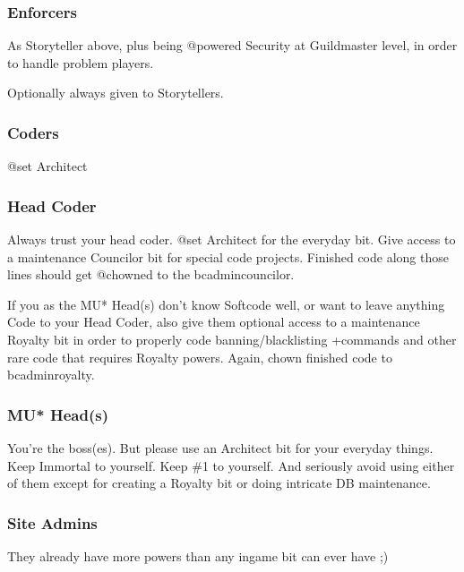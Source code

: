 \documentclass[letterpaper,10pt,english]{sphinxmanual}
\begin{document}
\subsubsection{Enforcers}
\label{\detokenize{gettingstarted:enforcers}}
\sphinxAtStartPar
As Storyteller above, plus being @powered Security at
Guildmaster level, in order to handle problem players.

\sphinxAtStartPar
Optionally always given to Storytellers.


\subsubsection{Coders}
\label{\detokenize{gettingstarted:coders}}
\sphinxAtStartPar
@set Architect


\subsubsection{Head Coder}
\label{\detokenize{gettingstarted:head-coder}}
\sphinxAtStartPar
Always trust your head coder.
@set Architect for the everyday bit. Give access to a
maintenance Councilor bit for special code projects. Finished
code along those lines should get @chowned to the
bc\sphinxhyphen{}admin\sphinxhyphen{}councilor.

\sphinxAtStartPar
If you as the MU* Head(s) don’t know Softcode well, or want to
leave anything Code to your Head Coder, also give them optional
access to a maintenance Royalty bit in order to properly code
banning/blacklisting +commands and other rare code that requires
Royalty powers. Again, chown finished code to bc\sphinxhyphen{}admin\sphinxhyphen{}royalty.


\subsubsection{MU* Head(s)}
\label{\detokenize{gettingstarted:mu-head-s}}
\sphinxAtStartPar
You’re the boss(es). But please use an Architect bit for your
everyday things. Keep Immortal to yourself. Keep \#1 to yourself.
And seriously avoid using either of them except for creating
a Royalty bit or doing intricate DB maintenance.


\subsubsection{Site Admins}
\label{\detokenize{gettingstarted:site-admins}}
\sphinxAtStartPar
They already have more powers than any in\sphinxhyphen{}game bit can ever
have ;)
\end{document}
